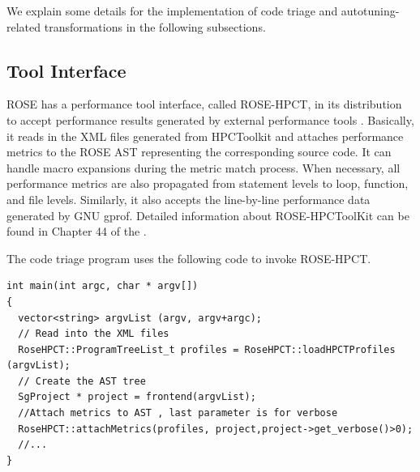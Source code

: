 We explain some details for the implementation of code triage and
autotuning-related transformations in the following subsections.
\subsection{Tool Interface}
ROSE has a performance tool interface, called ROSE-HPCT,
in its distribution to accept performance results generated by external
performance tools .  
Basically, it reads in the XML files generated from HPCToolkit and attaches performance metrics to
the ROSE AST representing the corresponding source code.
It can handle macro expansions during the metric match process.
When necessary, all performance metrics are also propagated from statement
levels to loop, function, and file levels. 
Similarly, it also accepts the line-by-line performance data generated by GNU
gprof.
Detailed information about ROSE-HPCToolKit can be found in Chapter 44 of
the .

The code triage program uses the following code to invoke ROSE-HPCT.

{\mySmallFontSize
\begin{verbatim}
int main(int argc, char * argv[]) 
{
  vector<string> argvList (argv, argv+argc);
  // Read into the XML files
  RoseHPCT::ProgramTreeList_t profiles = RoseHPCT::loadHPCTProfiles (argvList);
  // Create the AST tree
  SgProject * project = frontend(argvList);
  //Attach metrics to AST , last parameter is for verbose
  RoseHPCT::attachMetrics(profiles, project,project->get_verbose()>0);
  //...
}
\end{verbatim}
}

